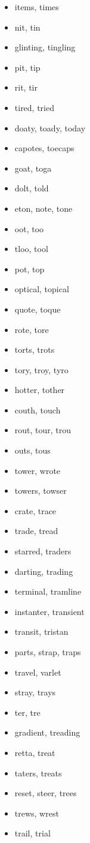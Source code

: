 \documentclass[a4wide,11pt]{report}
\begin{document}
\begin{itemize}
  \item items, times
  \item nit, tin
  \item glinting, tingling
  \item pit, tip
  \item rit, tir
  \item tired, tried
  \item doaty, toady, today
  \item capotes, toecaps
  \item goat, toga
  \item dolt, told
  \item eton, note, tone
  \item oot, too
  \item tloo, tool
  \item pot, top
  \item optical, topical
  \item quote, toque
  \item rote, tore
  \item torts, trots
  \item tory, troy, tyro
  \item hotter, tother
  \item couth, touch
  \item rout, tour, trou
  \item outs, tous
  \item tower, wrote
  \item towers, towser
  \item crate, trace
  \item trade, tread
  \item starred, traders
  \item darting, trading
  \item terminal, tramline
  \item instanter, transient
  \item transit, tristan
  \item parts, strap, traps
  \item travel, varlet
  \item stray, trays
  \item ter, tre
  \item gradient, treading
  \item retta, treat
  \item taters, treats
  \item reset, steer, trees
  \item trews, wrest
  \item trail, trial

\end{itemize}
\end{document}
